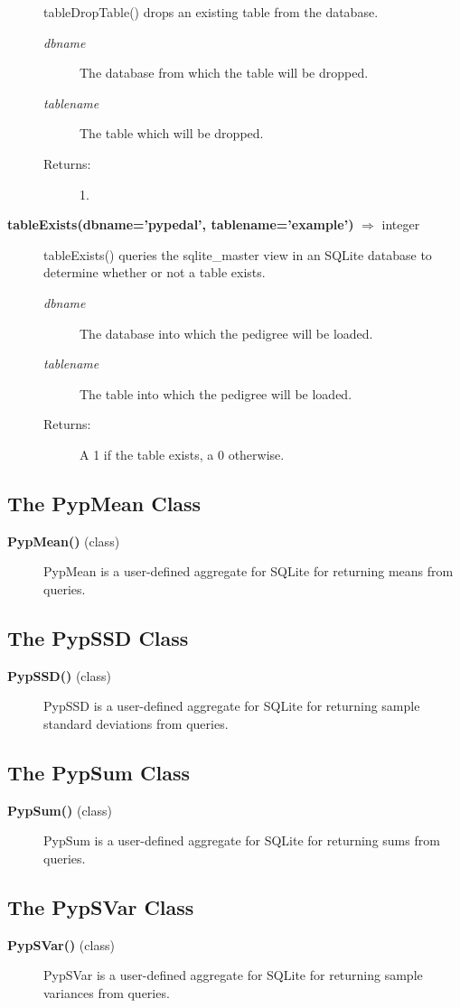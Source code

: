 \begin{description}
tableDropTable() drops an existing table from the database.
\begin{description}
\item[\emph{dbname}] The database from which the table will be dropped.
\item[\emph{tablename}] The table which will be dropped.
\item[Returns:] 1.
\end{description}
\item[\textbf{tableExists(dbname='pypedal', tablename='example')} $\Rightarrow$ integer]
tableExists() queries the sqlite\_master view in an SQLite database to determine whether or not a table exists.
\begin{description}
\item[\emph{dbname}] The database into which the pedigree will be loaded.
\item[\emph{tablename}] The table into which the pedigree will be loaded.
\item[Returns:] A 1 if the table exists, a 0 otherwise.
\end{description}
\end{description}
\subsection*{The PypMean Class}
\begin{description}
\item[\textbf{PypMean()} (class)]
PypMean is a user-defined aggregate for SQLite for returning means from queries.
\end{description}
\subsection*{The PypSSD Class}
\begin{description}
\item[\textbf{PypSSD()} (class)]
PypSSD is a user-defined aggregate for SQLite for returning sample standard deviations from queries.
\end{description}
\subsection*{The PypSum Class}
\begin{description}
\item[\textbf{PypSum()} (class)]
PypSum is a user-defined aggregate for SQLite for returning sums from queries.
\end{description}
\subsection*{The PypSVar Class}
\begin{description}
\item[\textbf{PypSVar()} (class)]
PypSVar is a user-defined aggregate for SQLite for returning sample variances from queries.
\end{description}